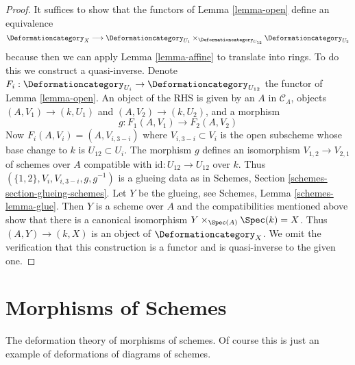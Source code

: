 \begin{proof}
It suffices to show that the functors of Lemma \ref{lemma-open}
define an equivalence
$$
\Deformationcategory_X \longrightarrow
\Deformationcategory_{U_1}
\times_{\Deformationcategory_{U_{12}}}
\Deformationcategory_{U_2}
$$
because then we can apply Lemma \ref{lemma-affine} to translate into rings.
To do this we construct a quasi-inverse. Denote
$F_i : \Deformationcategory_{U_i} \to \Deformationcategory_{U_{12}}$
the functor of Lemma \ref{lemma-open}.
An object of the RHS is given by an $A$ in $\mathcal{C}_\Lambda$,
objects $(A, V_1) \to (k, U_1)$ and $(A, V_2) \to (k, U_2)$, and
a morphism
$$
g : F_1(A, V_1) \to F_2(A, V_2)
$$
Now $F_i(A, V_i) = (A, V_{i, 3 - i})$ where $V_{i, 3 - i} \subset V_i$
is the open subscheme whose base change to $k$ is $U_{12} \subset U_i$.
The morphism $g$ defines an isomorphism
$V_{1, 2} \to V_{2, 1}$ of schemes over $A$ compatible
with $\text{id} : U_{12} \to U_{12}$ over $k$.
Thus $(\{1, 2\}, V_i, V_{i, 3 - i}, g, g^{-1})$ is a glueing
data as in Schemes, Section \ref{schemes-section-glueing-schemes}.
Let $Y$ be the glueing, see Schemes, Lemma \ref{schemes-lemma-glue}.
Then $Y$ is a scheme over $A$ and the
compatibilities mentioned above show that
there is a canonical isomorphism
$Y \times_{\Spec(A)} \Spec(k) = X$.
Thus $(A, Y) \to (k, X)$ is an object of $\Deformationcategory_X$.
We omit the verification that this construction is a functor
and is quasi-inverse to the given one.
\end{proof}






\section{Morphisms of Schemes}
\label{section-schemes-morphisms}

\noindent
The deformation theory of morphisms of schemes.
Of course this is just an example of
deformations of diagrams of schemes.

